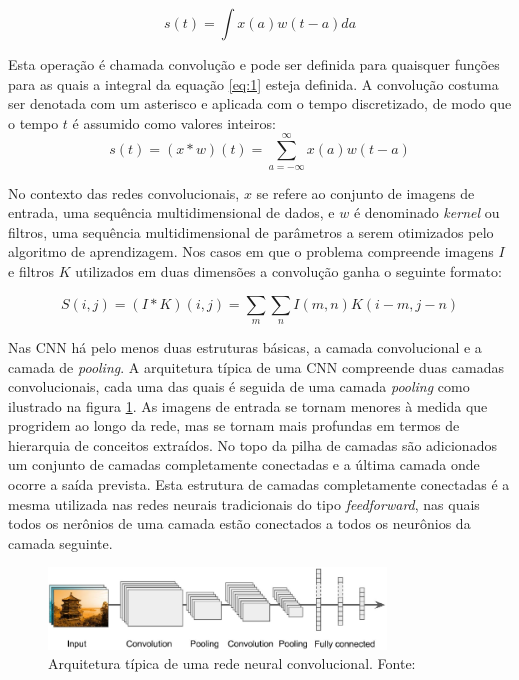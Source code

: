 \begin{equation}
 s(t) = \int{x(a) w(t-a)da}
 \label{eq:1}
\end{equation}

Esta operação é chamada convolução e pode ser definida para quaisquer
funções para as quais a integral da equação \ref{eq:1} esteja definida. A convolução
costuma ser denotada com um asterisco e aplicada com
o tempo discretizado, de modo que o tempo $t$ é assumido como valores inteiros:
\begin{equation}
 s(t) = (x * w)(t) = \sum_{a=-\infty}^{\infty}{x(a)w(t-a)}
 \label{eq:2}
\end{equation}

No contexto das redes convolucionais, $x$ se refere ao conjunto de imagens de entrada, uma sequência multidimensional
de dados, e $w$ é denominado \textit{kernel} ou filtros, uma sequência multidimensional de parâmetros 
a serem otimizados pelo algoritmo de aprendizagem.
Nos casos em que o problema compreende imagens $I$ e filtros $K$ utilizados em duas dimensões
a convolução ganha o seguinte formato:

\begin{equation}
 S(i,j) = (I*K)(i,j) = \sum_{m}\sum_{n}{I(m,n)K(i-m,j-n)}
\end{equation}

Nas CNN há pelo menos duas estruturas básicas, a camada convolucional e a camada de \textit{pooling}.
A arquitetura típica de uma CNN compreende duas camadas convolucionais, cada uma das quais é seguida de
uma camada \textit{pooling} como ilustrado na figura \ref{fig:cnn_basic_arq}. As imagens 
de entrada se tornam menores à medida que progridem ao longo da rede,
mas se tornam mais profundas em termos de hierarquia de conceitos extraídos. No topo da pilha de camadas
são adicionados um conjunto de camadas completamente conectadas e a última camada onde ocorre
a saída prevista. Esta estrutura de camadas completamente
conectadas é a mesma utilizada nas redes neurais tradicionais do tipo \textit{feedforward}, nas quais todos
os nerônios de uma camada estão conectados a todos os neurônios da camada seguinte. 
\begin{figure}[htp]
\begin{center}
  \includegraphics[width=0.8\textwidth]{fig/cnn_basic_arq}
  \caption{Arquitetura típica de uma rede neural convolucional. Fonte:\cite{aurelien17}}
  \label{fig:cnn_basic_arq}
\end{center}
\end{figure}

